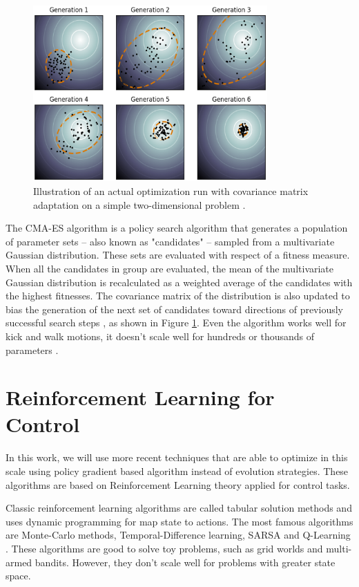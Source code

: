 \begin{figure}[ht!]
	\centering
	\includegraphics[width=0.8\textwidth]{Cap2/CMAES.eps}
	\caption{Illustration of an actual optimization run with covariance matrix adaptation on a simple two-dimensional problem
		\cite{cmaesfig}.}
	\label{cmaesfigure}
\end{figure}

The CMA-ES algorithm is a policy search algorithm that generates a population of parameter sets -- also known as "candidates" -- sampled from a multivariate Gaussian distribution. These sets are evaluated with respect of a fitness measure. When all the candidates in group are evaluated, the mean of the multivariate Gaussian
distribution is recalculated as a weighted average of the
candidates with the highest fitnesses. The covariance matrix
of the distribution is also updated to bias the generation
of the next set of candidates toward directions of previously
successful search steps \cite{AAMAS11-urieli}, as shown in Figure \ref{cmaesfigure}. Even the algorithm works well for kick and walk motions, it doesn't scale well for hundreds or thousands of parameters \cite{mcalpine2017}.


\section{Reinforcement Learning for Control}

In this work, we will use more recent techniques that are able to optimize in this scale using policy gradient based algorithm instead of evolution strategies. These algorithms are based on Reinforcement Learning theory applied for control tasks.

Classic reinforcement learning algorithms are called tabular solution methods and uses dynamic programming for map state to actions. The most famous algorithms are Monte-Carlo methods, Temporal-Difference learning, SARSA \cite{Rummery94on-lineq-learning} and Q-Learning \cite{Watkins:1989}. These algorithms are good to solve toy problems, such as grid worlds and multi-armed bandits. However, they don't scale well for problems with greater state space.

